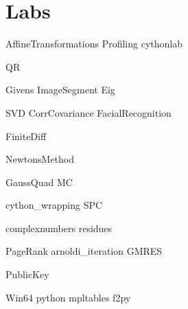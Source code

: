 \documentclass[nociteref]{SIAM-GH-book}
\begin{document}
\part{Labs}
{AffineTransformations}
{Profiling}
{cythonlab}

{QR}


{Givens}
{ImageSegment}
{Eig}


{SVD}
{CorrCovariance}
{FacialRecognition}

{FiniteDiff}

{NewtonsMethod}


{GaussQuad}
{MC}

{cython_wrapping}
{SPC}

{complexnumbers}
{residues}

{PageRank}
{arnoldi_iteration}
{GMRES}

{PublicKey}


\begin{appendices}
{Win64}
{python}
{mpltables}
{f2py}
\end{appendices}
\end{document}
